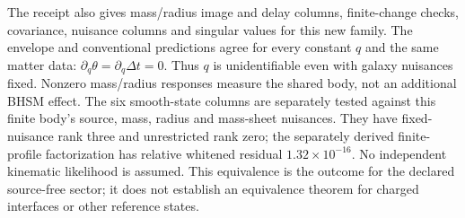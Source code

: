 \begin{center}\end{center}
The receipt also gives mass/radius image and delay columns, finite-change
checks, covariance, nuisance columns and singular values for this new
family. The envelope and conventional predictions agree for every
constant $q$ and the same matter data: $\partial_q\theta=
\partial_q\Delta t=0$. Thus $q$ is unidentifiable even with galaxy
nuisances fixed. Nonzero mass/radius responses measure the shared body,
not an additional BHSM effect. The six smooth-state columns are separately
tested against this finite body's source, mass, radius and mass-sheet
nuisances. They have fixed-nuisance rank three and unrestricted rank zero;
the separately derived finite-profile factorization has relative
whitened residual $1.32\times10^{-16}$. No independent kinematic
likelihood is assumed. This
equivalence is the outcome for the declared source-free sector; it does
not establish an equivalence theorem for charged interfaces or other
reference states.
